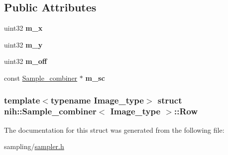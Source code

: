 \subsection*{\-Public \-Attributes}
\begin{DoxyCompactItemize}
\item 
\hypertarget{structnih_1_1_sample__combiner_1_1_row_af47b87dfa5d2497d0f85f780971d2096}{
uint32 {\bfseries m\-\_\-x}}
\label{structnih_1_1_sample__combiner_1_1_row_af47b87dfa5d2497d0f85f780971d2096}

\item 
\hypertarget{structnih_1_1_sample__combiner_1_1_row_a0e99bea2fb0a1157470a7e4399193e81}{
uint32 {\bfseries m\-\_\-y}}
\label{structnih_1_1_sample__combiner_1_1_row_a0e99bea2fb0a1157470a7e4399193e81}

\item 
\hypertarget{structnih_1_1_sample__combiner_1_1_row_a15a9e879d7d74434e06d8eefee6d6c41}{
uint32 {\bfseries m\-\_\-off}}
\label{structnih_1_1_sample__combiner_1_1_row_a15a9e879d7d74434e06d8eefee6d6c41}

\item 
\hypertarget{structnih_1_1_sample__combiner_1_1_row_aa74549e18bc1763c29759b65fcda9525}{
const \hyperlink{classnih_1_1_sample__combiner}{\-Sample\-\_\-combiner} $\ast$ {\bfseries m\-\_\-sc}}
\label{structnih_1_1_sample__combiner_1_1_row_aa74549e18bc1763c29759b65fcda9525}

\end{DoxyCompactItemize}
\subsubsection*{template$<$typename Image\-\_\-type$>$ struct nih\-::\-Sample\-\_\-combiner$<$ Image\-\_\-type $>$\-::\-Row}



\-The documentation for this struct was generated from the following file\-:\begin{DoxyCompactItemize}
\item 
sampling/\hyperlink{sampler_8h}{sampler.\-h}\end{DoxyCompactItemize}
